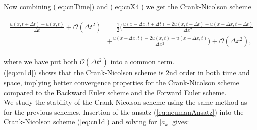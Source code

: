\documentclass{article}
\begin{document}
Now combining (\ref{eq:cnTime}) and (\ref{eq:cnX4}) we get the Crank-Nicolson scheme

\begin{subequations}\label{eq:cn1d}
	\begin{align}
		\begin{split}
			\frac{u(x,t+\Delta t) - u(x,t)}{\Delta t} + \mathcal{O}(\Delta t^2)
			&= \frac{1}{2} \Big(\frac{u(x-\Delta x,t+ \Delta t)
			- 2u(x,t+\Delta t) +u(x+\Delta x,t+\Delta t)}{\Delta x^2} \\
			&+ \frac{u(x-\Delta x,t) - 2u(x,t) +u(x+ \Delta x,t)}{\Delta x^2} \Big) + \mathcal{O}(\Delta x^2),
		\end{split}
	\end{align}
\end{subequations}

where we have put both $\mathcal{O}(\Delta t^2)$ into a common term.\\

(\ref{eq:cn1d}) shows that the Crank-Nicolson scheme is 2nd order in both time and space, implying better convergence properties for the Crank-Nicolson scheme compared to the Backward Euler scheme and the Forward Euler scheme.\\

We study the stability of the Crank-Nicolson scheme using the same method as for the previous schemes. Insertion of the ansatz (\ref{eq:neumanAnsatz}) into the Crank-Nicolson scheme (\ref{eq:cn1d}) and solving for $|a_k|$ gives:
\end{document}
